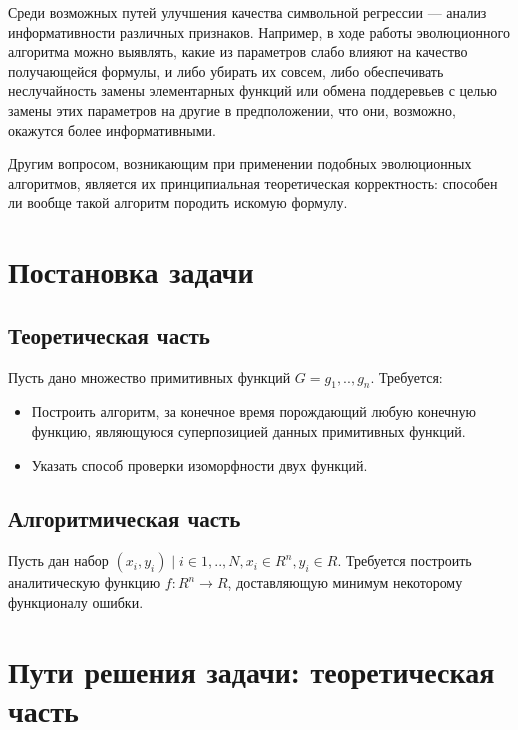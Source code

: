 \documentclass[12pt,a4paper]{amsart}
\begin{document}
Среди возможных путей улучшения качества символьной регрессии --- анализ
информативности различных признаков. Например, в ходе работы эволюционного
алгоритма можно выявлять, какие из параметров слабо влияют на качество
получающейся формулы, и либо убирать их совсем, либо обеспечивать
неслучайность замены элементарных функций или обмена поддеревьев с целью
замены этих параметров на другие в предположении, что они, возможно,
окажутся более информативными.

Другим вопросом, возникающим при применении подобных эволюционных алгоритмов,
является их принципиальная теоретическая корректность: способен ли вообще
такой алгоритм породить искомую формулу.

\section{Постановка задачи}

\subsection{Теоретическая часть}

Пусть дано множество примитивных функций $G = { g_1, .., g_n }$. Требуется:

\begin{itemize}
  \item Построить алгоритм, за конечное время порождающий любую конечную функцию,
	являющуюся суперпозицией данных примитивных функций.
  \item Указать способ проверки изоморфности двух функций.
\end{itemize}

\subsection{Алгоритмическая часть}

Пусть дан набор $(x_i, y_i) \mid i \in {1,..,N}, x_i \in R^n, y_i \in R$.
Требуется построить аналитическую функцию $f : R^n \rightarrow R$, доставляющую
минимум некоторому функционалу ошибки.

\section{Пути решения задачи: теоретическая часть}



\extrasrussian

\end{document}
